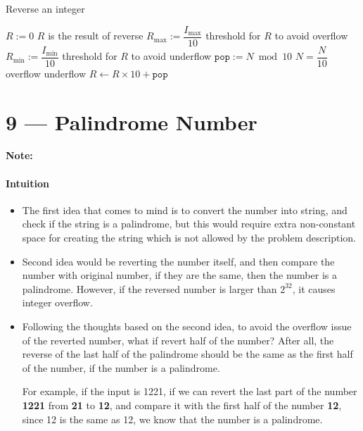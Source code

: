 \documentclass[a4paper,12pt]{article}
\begin{document}
\setcounter{algorithm}{0}
\begin{algorithm}[H]
\caption{Reverse an integer}
\begin{algorithmic}[1]
\Statex
{}
\State $R:=0$ \Comment $R$ is the result of reverse
\State $R_{\max}:= \dfrac{I_{\max}}{10}$ \Comment threshold for $R$ to avoid overflow
\State $R_{\min}:= \dfrac{I_{\min}}{10}$ \Comment threshold for $R$ to avoid underflow
\State $\mathtt{pop} := N \bmod 10$
\State $N = \dfrac{N}{10}$
 \Comment overflow
\State {}
 \Comment underflow
\State {}
\Else
\State $R\gets R\times 10 + \mathtt{pop}$
\EndIf
\EndWhile
\EndProcedure
\Statex
\end{algorithmic}
\end{algorithm}

\section{9 --- Palindrome Number}
\textbf{\large{Note:}}
\par
\noindent
\paragraph{Intuition}
\begin{itemize}
\item The first idea that comes to mind is to convert the number into string, and check if the string is a palindrome, but this would require extra non-constant space for creating the string which is not allowed by the problem description.
\item Second idea would be reverting the number itself, and then compare the number with original number, if they are the same, then the number is a palindrome. However, if the reversed number is larger than $2^{32}$, it causes integer overflow.
\item Following the thoughts based on the second idea, to avoid the overflow issue of the reverted number, what if revert {\color{red}half} of the number? After all, the reverse of the last half of the palindrome should be the same as the first half of the number, if the number is a palindrome.
\par
For example, if the input is 1221, if we can revert the last part of the number \textbf{1221} from {\textbf{\color{blue}21}} to {\textbf{\color{red}12}}, and compare it with the first half of the number \textbf{12}, since 12 is the same as 12, we know that the number is a palindrome.
\end{itemize}
\end{document}

